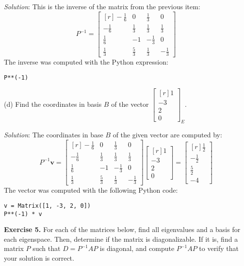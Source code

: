 \documentclass[12pt]{article}
\begin{document}
\emph{Solution}: This is the inverse of the matrix from the previous item:
\[
P^{-1}=\left[\begin{matrix*}[r]- \frac{1}{6} & 0 & \frac{1}{3} & 0\\- \frac{1}{6} & \frac{1}{3} & \frac{1}{3} & \frac{1}{3}\\\frac{1}{6} & -1 & - \frac{1}{3} & 0\\\frac{1}{3} & \frac{5}{3} & \frac{1}{3} & - \frac{1}{3}\end{matrix*}\right]
\]
The inverse was computed with the Python expression:

\begin{lstlisting}
P**(-1)
\end{lstlisting}
\endproof

\medskip
(d) Find the coordinates in basis $B$ of the vector
$\begin{bmatrix*}[r]1\\-3\\2\\0\end{bmatrix*}_E$.

\emph{Solution}: The coordinates in base $B$ of the given vector are computed by:
\[
P^{-1}\mathbf{v}=\left[\begin{matrix*}[r]- \frac{1}{6} & 0 & \frac{1}{3} & 0\\- \frac{1}{6} & \frac{1}{3} & \frac{1}{3} & \frac{1}{3}\\\frac{1}{6} & -1 & - \frac{1}{3} & 0\\\frac{1}{3} & \frac{5}{3} & \frac{1}{3} & - \frac{1}{3}\end{matrix*}\right]
\begin{bmatrix*}[r]1\\-3\\2\\0\end{bmatrix*}=
\left[\begin{matrix*}[r]\frac{1}{2}\\- \frac{1}{2}\\\frac{5}{2}\\-4\end{matrix*}\right]
\]
The vector was computed with the following Python code:
\begin{lstlisting}
v = Matrix([1, -3, 2, 0])
P**(-1) * v
\end{lstlisting}
\proofend

\bigskip
\textbf{Exercise 5.} For each of the matrices below, find all eigenvalues and a basis for each eigenspace. Then, determine if the matrix is diagonalizable. If it is, find a matrix $P$ such that $D=P^{-1}AP$ is diagonal, and compute $P^{-1}AP$ to verify that your solution is correct.
\end{document}
